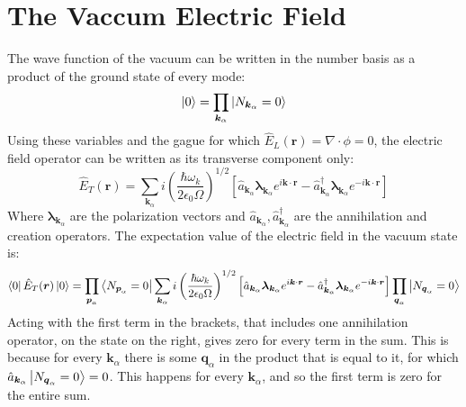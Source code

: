 \documentclass{article}
\begin{document}
\section{The Vaccum Electric Field}
The wave function of the vacuum can be written in the number basis as a product of the ground state of every mode:
\begin{equation}
    \ket{0} = \prod_{\boldsymbol{k}_\alpha} \ket{N_{\boldsymbol{k}_\alpha} = 0}
\end{equation}
Using these variables and the gague for which $\hat{E}_L(\boldsymbol{r}) = \nabla \cdot \phi = 0$, the electric field operator can be written as its transverse component only:
\begin{equation}
    \hat{E}_T(\boldsymbol{r}) = \sum_{\boldsymbol{k}_\alpha} i \left(\frac{\hbar \omega_k}{2\epsilon_0\Omega}\right)^{1/2}\left[
        \hat{a}_{\boldsymbol{k}_\alpha}\boldsymbol{\lambda}_{\boldsymbol{k}_\alpha} e^{i\boldsymbol{k}\cdot\boldsymbol{r}}
        -
        \hat{a}_{\boldsymbol{k}_\alpha}^\dagger\boldsymbol{\lambda}_{\boldsymbol{k}_\alpha} e^{-i\boldsymbol{k}\cdot\boldsymbol{r}}
    \right]
\end{equation}
Where $\boldsymbol{\lambda}_{\boldsymbol{k}_\alpha}$ are the polarization vectors and $\hat{a}_{\boldsymbol{k}_\alpha}, \hat{a}_{\boldsymbol{k}_\alpha}^\dagger$ are the annihilation and creation operators. The expectation value of the electric field in the vacuum state is:
\begin{equation}
    \bra{0} \hat{E}_T(\boldsymbol{r}) \ket{0} = 
    \prod_{\boldsymbol{p}_\alpha} \bra{N_{\boldsymbol{p}_\alpha} = 0}
    \sum_{\boldsymbol{k}_\alpha} i \left(\frac{\hbar \omega_k}{2\epsilon_0\Omega}\right)^{1/2}\left[
        \hat{a}_{\boldsymbol{k}_\alpha}\boldsymbol{\lambda}_{\boldsymbol{k}_\alpha} e^{i\boldsymbol{k}\cdot\boldsymbol{r}}
        -
        \hat{a}_{\boldsymbol{k}_\alpha}^\dagger\boldsymbol{\lambda}_{\boldsymbol{k}_\alpha} e^{-i\boldsymbol{k}\cdot\boldsymbol{r}}
    \right] \prod_{\boldsymbol{q}_\alpha} \ket{N_{\boldsymbol{q}_\alpha} = 0}
\end{equation}
Acting with the first term in the brackets, that includes one annihilation operator, on the state on the right, gives zero for every term in the sum. This is because for every $\boldsymbol{k}_\alpha$ there is some $\boldsymbol{q}_\alpha$ in the product that is equal to it, for which $\hat{a}_{\boldsymbol{k}_\alpha}\ket{N_{\boldsymbol{q}_\alpha}=0}=0$. This happens for every $\boldsymbol{k}_\alpha$, and so the first term is zero for the entire sum.
\newline
\end{document}
